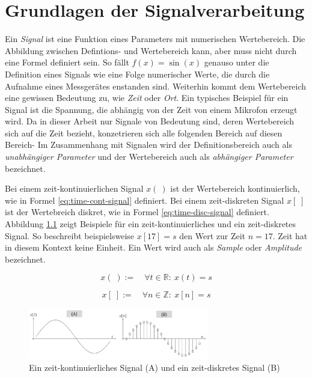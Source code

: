 \chapter{Grundlagen der Signalverarbeitung}
\label{sec:signalFoundations}

Ein \emph{Signal} ist eine Funktion eines Parameters mit numerischen Wertebereich. Die Abbildung zwischen Defintions- und Wertebereich kann, aber muss nicht durch eine Formel definiert sein. So fällt $f(x) = \sin( x )$ genauso unter die Definition eines Signals wie eine Folge numerischer Werte, die durch die Aufnahme eines Messgerätes enstanden sind. Weiterhin kommt dem Wertebereich eine gewissen Bedeutung zu, wie \emph{Zeit} oder \emph{Ort}. Ein typisches Beispiel für ein Signal ist die Spannung, die abhängig von der Zeit von einem Mikrofon erzeugt wird.  Da in dieser Arbeit nur Signale von Bedeutung sind, deren Wertebereich sich auf die Zeit bezieht, konzetrieren sich alle folgenden Bereich auf diesen Bereich- Im Zusammenhang mit Signalen wird der Definitionsbereich auch als \emph{unabhängiger Parameter} und der Wertebereich auch als \emph{abhängiger Parameter} bezeichnet. \cite[S. 11-12]{dspGuide} \cite[S. 22-23]{dspMichigan}

\medskip

 Bei einem zeit-kontinuierlichen Signal $x( \: )$ ist der Wertebereich kontinuierlich, wie in Formel  \ref{eq:time-cont-signal} definiert. Bei einem zeit-diskreten Signal $x[\;]$ ist der Wertebreich diskret, wie in Formel \ref{eq:time-disc-signal} definiert. Abbildung \ref{img:aSignal} zeigt Beispiele für ein zeit-kontinuierliches und ein zeit-diskretes Signal.  So beschreibt beispielsweise $x[17] = s$ den Wert zur Zeit $n = 17$. \glqq Zeit\grqq{} hat in diesem Kontext keine Einheit. Ein Wert wird auch als \emph{Sample} oder \emph{Amplitude} bezeichnet. \cite[S. 22 - 23]{dspMichigan}

 \begin{equation}
x(\;) := \quad \forall t \in \mathbb{R} :\ x(t) = s
\label{eq:time-cont-signal}
\end{equation}


\begin{equation}
x[\;] := \quad  \forall n \in \mathbb{Z} :\ x[n] = s
\label{eq:time-disc-signal}
\end{equation}

\begin{figure}
	\centering
	\includegraphics[width=0.7\textwidth]{bilder/aSignal04.png}
	\caption{Ein zeit-kontinuierliches Signal (A) und ein zeit-diskretes Signal (B)}
	\label{img:aSignal}
\end{figure}

